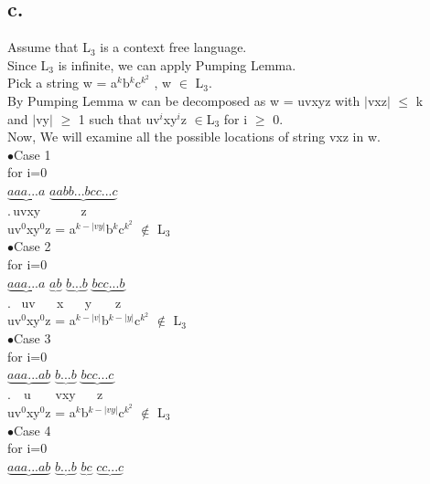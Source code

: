 \documentclass[12pt]{article}
\begin{document}
\subsection*{c.}
Assume that L$_3$ is a context free language. \\
Since L$_3$ is infinite, we can apply Pumping Lemma. \\
Pick a string w = a$^k$b$^k$c$^{k^2}$ , w $\in$ L$_3$. \\
By Pumping Lemma w can be decomposed as w = uvxyz with $\vert$vxz$\vert$ $\leq$ k \\
and $\vert$vy$\vert$ $\geq$ 1 such that uv$^i$xy$^i$z $\in$L$_3$ for i $\geq$ 0. \\
Now, We will examine all the possible locations of string vxz in w. \\
$\bullet$Case 1 \\
for i=0 \\
$\underbrace{aaa...a}$ $\underbrace{aabb...bcc...c}$ \\
.$\hspace{2pt}$uvxy$ \hspace{38pt}$z \\
uv$^0$xy$^0$z = a$^{k-|vy|}$b$^k$c$^{k^2}$ $\notin$ L$_3$ \\
$\bullet$Case 2 \\
for i=0 \\
$\underbrace{aaa...a}$ $\underbrace{ab}$ $\underbrace{b...b}$ $\underbrace{bcc...b}$ \\
.$\hspace{10pt}$uv$\hspace{20pt}$x$\hspace{20pt}$y$\hspace{22pt}$z \\
uv$^0$xy$^0$z = a$^{k-|v|}$b$^{k-|y|}$c$^{k^2}$ $\notin$ L$_3$ \\
$\bullet$Case 3 \\
for i=0 \\
$\underbrace{aaa...ab}$ $\underbrace{b...b}$ $\underbrace{bcc...c}$ \\
.$\hspace{12pt}$u$\hspace{23pt}$vxy$\hspace{20pt}$z \\
uv$^0$xy$^0$z = a$^k$b$^{k-|vy|}$c$^{k^2}$ $\notin$ L$_3$ \\
$\bullet$Case 4 \\
for i=0 \\
$\underbrace{aaa...ab}$ $\underbrace{b...b}$ $\underbrace{bc}$ $\underbrace{cc...c}$ \\
\end{document}
